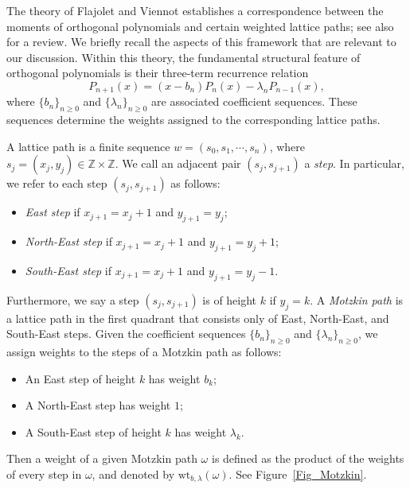 \documentclass{amsart}
\theoremstyle{plain}
\theoremstyle{remark}
\numberwithin{equation}{section}
\begin{document}
 

 
 

The theory of Flajolet and Viennot \cite{Fl80,Vi00} establishes a correspondence between the moments of orthogonal polynomials and certain weighted lattice paths; see also \cite{CKS16} for a review. We briefly recall the aspects of this framework that are relevant to our discussion.
Within this theory, the fundamental structural feature of orthogonal polynomials is their three-term recurrence relation
\begin{equation}\label{eqn:three term recurrence of orthogonal polynomial}
    P_{n+1}(x)=(x-b_{n})P_{n}(x)-\lambda_{n}P_{n-1}(x),  
\end{equation}
where $\{b_n\}_{n\ge 0}$ and $\{\lambda_n\}_{n\ge 0}$ are associated coefficient sequences. These sequences determine the weights assigned to the corresponding lattice paths.

A lattice path is a finite sequence $w= (s_{0}, s_{1},\cdots ,s_{n})$, where $s_{j}=(x_j,y_j)\in\mathbb{Z}\times\mathbb{Z}$. We call an adjacent pair $(s_{j},s_{j+1})$ a \textit{step}. In particular, we refer to each step $(s_j ,s_{j+1})$ as follows:
\begin{itemize}
    \item \emph{East step} if $x_{j+1}=x_{j}+1$ and $y_{j+1}=y_{j}$;
    \smallskip 
    \item \emph{North-East step} if $x_{j+1}=x_{j}+1$ and $y_{j+1}=y_{j}+1$;
     \smallskip 
    \item \emph{South-East step} if $x_{j+1}=x_{j}+1$ and $y_{j+1}=y_{j}-1$. 
\end{itemize}
Furthermore, we say a step $(s_j,s_{j+1})$ is of height $k$ if $y_j=k$. 
A \emph{Motzkin path} is a lattice path in the first quadrant that consists 
only of East, North-East, and South-East steps. 
Given the coefficient sequences $\{b_n\}_{n\ge 0}$ and $\{\lambda_n\}_{n\ge 0}$, we assign weights to the steps of a Motzkin path as follows:
\begin{itemize}
    \item An East step of height $k$ has weight $b_k$;
     \smallskip 
    \item A North-East step has weight $1$;
     \smallskip 
    \item A South-East step of height $k$ has weight $\lambda_{k}$.
\end{itemize}
Then a weight of a given Motzkin path $\omega$ is defined as the product of the weights of every step in $\omega$, and denoted by $\mathrm{wt}_{b,\lambda}(\omega)$. See Figure~\ref{Fig_Motzkin}. 
\end{document}
